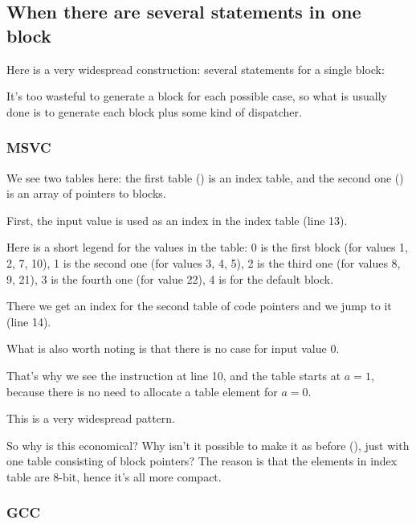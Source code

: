 \subsection{When there are several  statements in one block}

Here is a very widespread construction: several  statements for a single block:



It's too wasteful to generate a block for each possible case,
so what is usually done is to generate each block plus some kind of dispatcher.

\subsubsection{MSVC}



We see two tables here: the first table () is an index table, and the second one () is an array of pointers to blocks.

First, the input value is used as an index in the index table (line 13). 

Here is a short legend for the values in the table: 
0 is the first  block (for values 1, 2, 7, 10),
1 is the second one (for values 3, 4, 5),
2 is the third one (for values 8, 9, 21),
3 is the fourth one (for value 22),
4 is for the default block.

There we get an index for the second table of code pointers and we jump to it (line 14).

What is also worth noting is that there is no case for input value 0.

That's why we see the \DEC instruction at line 10, and the table starts at $a=1$, 
because there is no need to allocate a table element for $a=0$.

This is a very widespread pattern.

So why is this economical?
Why isn't it possible to make it as before
(), just with one table consisting of block pointers?
The reason is that the elements in index table are 8-bit, hence it's all more compact.

\subsubsection{GCC}

